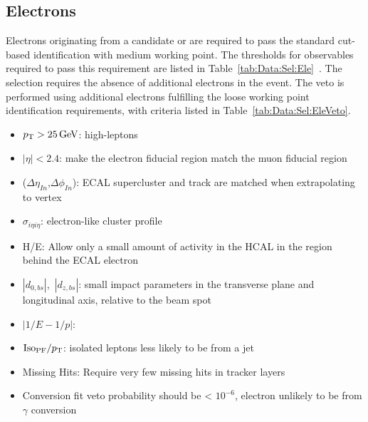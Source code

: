 \subsection{Electrons}\label{ch:IdIso:Ele}
Electrons originating from a candidate \Wpm or \Z are required to pass the standard cut-based identification with medium working point. The thresholds for observables required to pass this requirement are listed in Table~\ref{tab:Data:Sel:Ele}~\cite{EgammaIDIsoCuts}. The \Wpm selection requires the absence of additional electrons in the event. The veto is performed using additional electrons fulfilling the loose working point identification requirements, with criteria listed in Table~\ref{tab:Data:Sel:EleVeto}. 
\begin{itemize}
    \item $p_{\mathrm{T}} > 25 \,\text{Ge\hspace{-.08em}V}$: high-\pt leptons
    \item $|\eta|< 2.4$: make the electron fiducial region match the muon fiducial region
    \item ($\Delta\eta_{In}$,$\Delta\phi_{In}$): ECAL supercluster and track are matched when extrapolating to vertex
    \item $\sigma_{i\eta i\eta}$: electron-like cluster profile
    \item H/E: Allow only a small amount of activity in the HCAL in the region behind the ECAL electron
    \item $|d_{0,bs}|$,~$|d_{z,bs}|$: small impact parameters in the transverse plane and longitudinal axis, relative to the beam spot
    \item $|1/E-1/p|$: 
    \item $\mathrm{Iso_{PF}}/p_{\mathrm{T}}$: isolated leptons less likely to be from a jet
    \item Missing Hits: Require very few missing hits in tracker layers
    \item Conversion fit veto probability should be < $10^{-6}$, electron unlikely to be from $\gamma$ conversion
\end{itemize}





